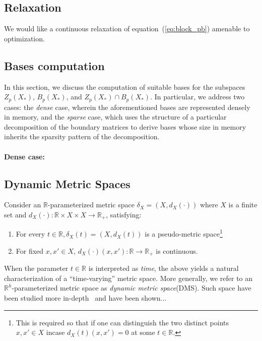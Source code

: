 \documentclass[10pt]{article}
\let\oldref\ref
\renewcommand{\ref}[1]{(\oldref{#1})}
\begin{document}

\subsection*{Relaxation}
\noindent We would like a continuous relaxation of equation~\ref{eq:block_pb} amenable to optimization.

\subsection*{Bases computation}
In this section, we discuss the computation of suitable bases for the subspaces $Z_p(X_\ast)$, $B_p(X_\ast)$, and $Z_p(X_\ast) \cap B_p(X_\ast)$. In particular, we address two cases: the \emph{dense} case, wherein the aforementioned bases are represented densely in memory, and the \emph{sparse} case, which uses the structure of a particular decomposition of the boundary matrices to derive bases whose size in memory inherits the sparsity pattern of the decomposition.
\\
\\
\textbf{Dense case:} 

\subsection*{Dynamic Metric Spaces}
Consider an $\mathbb{R}$-parameterized metric space $\delta_X = ( X, d_X(\cdot) )$ where
$X$ is a finite set and $d_X(\cdot): \mathbb{R} \times X \times X \to \mathbb{R}_{+}$, satisfying: 
\begin{enumerate}
	\item For every $t \in \mathbb{R}, \delta_X(t) = (X, d_X(t))$ is a pseudo-metric space\footnote{This is required so that if one can distinguish the two distinct points $x, x' \in X$ incase $d_X(t)(x, x') = 0$ at some $t \in \mathbb{R}$. } 
	\item For fixed $x, x' \in X$, $d_X(\cdot)(x, x'): \mathbb{R} \to \mathbb{R}_{+}$ is continuous.
\end{enumerate}
When the parameter $t \in \mathbb{R}$ is interpreted as \emph{time}, the above yields a natural characterization of a ``time-varying'' metric space. More generally, we refer to an $\mathbb{R}^h$-parameterized metric space as \emph{dynamic metric space}(DMS). Such space have been studied more in-depth~\cite{} and have been shown...
 
\end{document}
